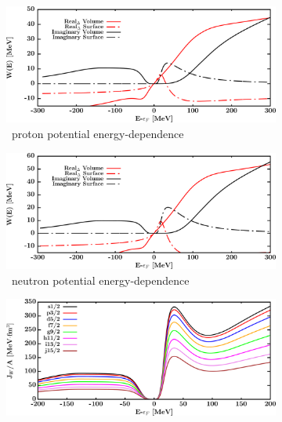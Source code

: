\begin{figure}[hbtp]
\begin{subfigure}[b]{0.45\textwidth}
        \centering
        \includegraphics[width=\linewidth]{figures/o18_protonPotentials.png}
        \caption{\oEight\ proton potential energy-dependence}
        \label{DOMFitData_o18_proton_potentialComponent_energy}
    \end{subfigure}\hspace{6pt}
    \begin{subfigure}[b]{0.45\linewidth}
        \centering
        \includegraphics[width=\linewidth]{figures/o18_neutronPotentials.png}
        \caption{\oEight\ neutron potential energy-dependence}
        \label{DOMFitData_o18_neutron_potentialComponent_energy}
    \end{subfigure}\vspace{0.3in}
    \begin{subfigure}[b]{0.45\textwidth}
        \centering
        \includegraphics[width=\linewidth]{figures/o18_protonVolumeIntegrals.png}

\end{subfigure}
\end{figure}
